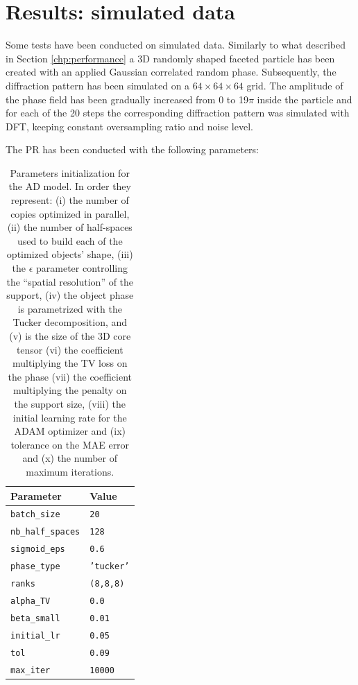 \section{Results: simulated data}
Some tests have been conducted on simulated data. Similarly to what described in Section \ref{chp:performance} a 3D 
randomly shaped faceted particle has been created with an applied Gaussian correlated random phase. Subsequently, 
the diffraction pattern has been simulated on a $64\times 64\times 64$ grid. The amplitude of the phase field has been 
gradually increased from 0 to 19$\pi$ inside the particle and for each of the 20 steps the corresponding diffraction pattern 
was simulated with DFT, keeping constant oversampling ratio and noise level. 

The PR has been conducted with the following parameters: 
\begin{table}[H] 

  \centering
  {%
    \begin{tabular}{|l|l|}
      \hline
      \textbf{Parameter} & \textbf{Value} \\
      \hline 
      \texttt{batch\_size}                      & \texttt{20} \\
      \texttt{nb\_half\_spaces}                 & \texttt{128} \\
      \texttt{sigmoid\_eps}                     & \texttt{0.6} \\
      \texttt{phase\_type}                      & \texttt{'tucker'} \\
      \texttt{ranks}                            & \texttt{(8,8,8)} \\
      \texttt{alpha\_TV}                        & \texttt{0.0} \\
      \texttt{beta\_small}                      & \texttt{0.01} \\
      \texttt{initial\_lr}                      & \texttt{0.05} \\
      \texttt{tol}                              & \texttt{0.09} \\
      \texttt{max\_iter}                        & \texttt{10000} \\

      \hline
    \end{tabular}%
  } 
  \caption{Parameters initialization for the AD model. In order they represent: (i) the number of copies optimized in 
  parallel, (ii) the number of half-spaces used to build each of the optimized objects' shape, (iii) the $\epsilon$ parameter 
  controlling the ``spatial resolution'' of the support, (iv) the object phase is parametrized with the Tucker decomposition, 
  and (v) is the size of the 3D core tensor (vi) the coefficient multiplying the TV loss on the phase (vii) the coefficient multiplying 
  the penalty on the support size, (viii) the initial learning rate for the ADAM optimizer and (ix) tolerance on the MAE error and (x) 
  the number of maximum iterations.}
  \label{table:AD1}
\end{table}

